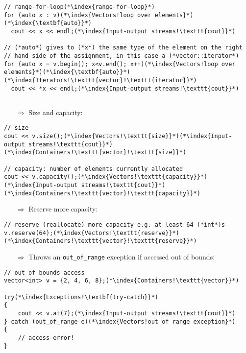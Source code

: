 \documentclass[10pt]{article}
\begin{document}
\begin{lstlisting}
// range-for-loop(*\index{range-for-loop}*)
for (auto x : v)(*\index{Vectors!loop over elements}*)(*\index{\textbf{auto}}*)
  cout << x << endl;(*\index{Input-output streams!\texttt{cout}}*)

// (*auto*) gives to (*x*) the same type of the element on the right
// hand side of the assignment, in this case a (*vector::iterator*)
for (auto x = v.begin(); x<v.end(); x++)(*\index{Vectors!loop over elements}*)(*\index{\textbf{auto}}*)(*\index{Iterators!\texttt{vector}!\texttt{iterator}}*)
  cout << *x << endl;(*\index{Input-output streams!\texttt{cout}}*)


\end{lstlisting}
\begin{enumerate}
\item[$\Rightarrow$] Size and capacity:
\end{enumerate}
\begin{lstlisting}
// size
cout << v.size();(*\index{Vectors!\texttt{size}}*)(*\index{Input-output streams!\texttt{cout}}*)(*\index{Containers!\texttt{vector}!\texttt{size}}*)

// capacity: number of elements currently allocated
cout << v.capacity();(*\index{Vectors!\texttt{capacity}}*)(*\index{Input-output streams!\texttt{cout}}*)(*\index{Containers!\texttt{vector}!\texttt{capacity}}*)
\end{lstlisting}
\begin{enumerate}
\item[$\Rightarrow$] Reserve more capacity:
\end{enumerate}
\begin{lstlisting}
// reserve (reallocate) more capacity e.g. at least 64 (*int*)s
v.reserve(64);(*\index{Vectors!\texttt{reserve}}*)(*\index{Containers!\texttt{vector}!\texttt{reserve}}*)
\end{lstlisting}
\begin{enumerate}
\item[$\Rightarrow$] Throws an \texttt{out\_of\_range} exception if accessed out of bounds:
\end{enumerate}
\begin{lstlisting}
// out of bounds access
vector<int> v = {2, 4, 6, 8};(*\index{Containers!\texttt{vector}}*)

try(*\index{Exceptions!\textbf{try-catch}}*)
{
    cout << v.at(7);(*\index{Input-output streams!\texttt{cout}}*)
} catch (out_of_range e)(*\index{Vectors!out of range exception}*)
{
    // access error!
}
\end{lstlisting}
%
%
\end{document}
